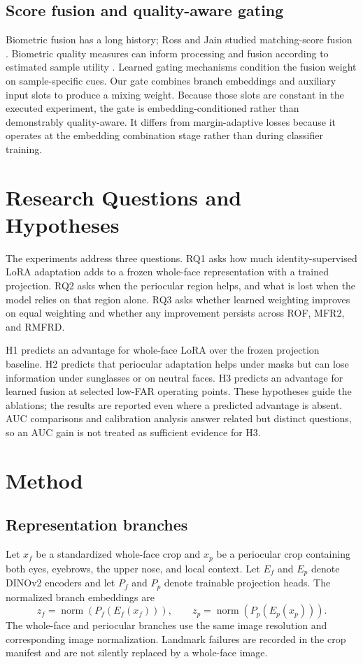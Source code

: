 \documentclass[10pt,journal,compsoc]{IEEEtran}
\begin{document}
\subsection{Score fusion and quality-aware gating}
Biometric fusion has a long history; Ross and Jain studied matching-score fusion \cite{fusionRossJain}. Biometric quality measures can inform processing and fusion according to estimated sample utility \cite{quality}. Learned gating mechanisms condition the fusion weight on sample-specific cues. Our gate combines branch embeddings and auxiliary input slots to produce a mixing weight. Because those slots are constant in the executed experiment, the gate is embedding-conditioned rather than demonstrably quality-aware. It differs from margin-adaptive losses \cite{magface,adaface} because it operates at the embedding combination stage rather than during classifier training.

\section{Research Questions and Hypotheses}
The experiments address three questions. RQ1 asks how much identity-supervised LoRA adaptation adds to a frozen whole-face representation with a trained projection. RQ2 asks when the periocular region helps, and what is lost when the model relies on that region alone. RQ3 asks whether learned weighting improves on equal weighting and whether any improvement persists across ROF, MFR2, and RMFRD.

H1 predicts an advantage for whole-face LoRA over the frozen projection baseline. H2 predicts that periocular adaptation helps under masks but can lose information under sunglasses or on neutral faces. H3 predicts an advantage for learned fusion at selected low-FAR operating points. These hypotheses guide the ablations; the results are reported even where a predicted advantage is absent. AUC comparisons and calibration analysis answer related but distinct questions, so an AUC gain is not treated as sufficient evidence for H3.

\section{Method}
\subsection{Representation branches}
Let $x_f$ be a standardized whole-face crop and $x_p$ be a periocular crop containing both eyes, eyebrows, the upper nose, and local context. Let $E_f$ and $E_p$ denote DINOv2 encoders and let $P_f$ and $P_p$ denote trainable projection heads. The normalized branch embeddings are
\begin{equation}
 z_f=\operatorname{norm}(P_f(E_f(x_f))),\qquad z_p=\operatorname{norm}(P_p(E_p(x_p))).
\end{equation}
The whole-face and periocular branches use the same image resolution and corresponding image normalization. Landmark failures are recorded in the crop manifest and are not silently replaced by a whole-face image.
\end{document}

